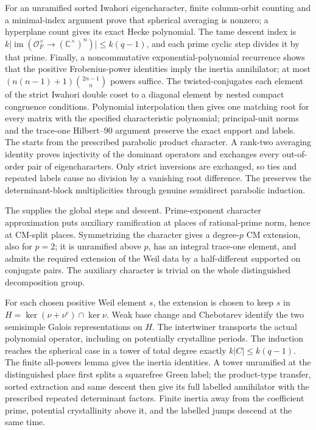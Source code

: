 For an unramified sorted Iwahori eigencharacter, finite column-orbit
counting and a minimal-index argument prove that spherical averaging
is nonzero; a hyperplane count gives its exact Hecke polynomial.
The tame descent index is
\(k\lvert\operatorname{im}(\mathcal O_F^\times\to(\mathbb C^\times)^n)\rvert
\le k(q-1)\), and each prime cyclic step divides it by that prime.
Finally, a noncommutative exponential-polynomial recurrence shows
that the positive Frobenius-power identities imply the inertia
annihilator; at most
\((n(n-1)+1)\binom{2n-1}{n}\) powers suffice.
The  twisted-conjugates each element of the strict Iwahori
double coset to a diagonal element by nested compact congruence conditions. Polynomial
interpolation then gives one matching root for every matrix with the
specified characteristic polynomial; principal-unit norms and the
trace-one Hilbert--90 argument preserve the exact support and labels.
The  starts from the prescribed parabolic product character.
A rank-two averaging identity proves injectivity of the dominant
operators and exchanges every out-of-order pair of eigencharacters.
Only strict inversions are exchanged, so ties and repeated labels
cause no division by a vanishing root difference.
The  preserves the determinant-block multiplicities
through genuine semidirect parabolic induction.

The  supplies the global steps and descent. Prime-exponent
character approximation puts auxiliary ramification at places of
rational-prime norm, hence at CM-split places. Symmetrizing the
character gives a degree-\(p\) CM extension, also for \(p=2\);
it is unramified above \(p\), has an integral trace-one element,
and admits the required extension of the Weil data by a half-different
supported on conjugate pairs. The auxiliary character is trivial
on the whole distinguished decomposition group.

For each chosen positive Weil element \(s\), the extension is
chosen to keep \(s\) in
\(H=\ker(\nu+\nu^c)\cap\ker\nu\).
Weak base change and Chebotarev identify the two semisimple
Galois representations on \(H\). The intertwiner transports the
actual polynomial operator, including on potentially crystalline
periods. The induction reaches the spherical case in a tower of
total degree exactly \(k|C|\le k(q-1)\).
The finite all-powers lemma gives the inertia identities.
A tower unramified at the distinguished place first splits a
squarefree Green label; the
product-type transfer, sorted extraction and same descent then
give its full labelled annihilator with the prescribed repeated
determinant factors. Finite inertia away from the coefficient prime,
potential crystallinity above it, and the labelled jumps descend
at the same time.

